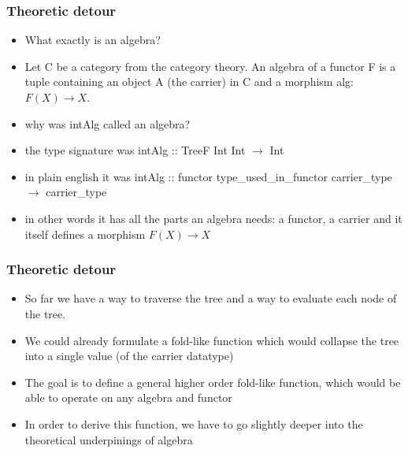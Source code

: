 \documentclass[10pt]{beamer}
\begin{document}
\begin{frame}[fragile]
\frametitle{Theoretic detour}
\begin{itemize}
\item What exactly is an algebra? 
\item Let C be a category from the category theory. An algebra of a functor F is a tuple containing an object A (the carrier) in C and a morphism alg:$F(X) \rightarrow X$. 
\item why was intAlg called an algebra?
\item the type signature was intAlg :: TreeF Int Int $\rightarrow$ Int
\item in plain english it was intAlg :: functor type\_used\_in\_functor carrier\_type $\rightarrow$ carrier\_type
\item in other words it has all the parts an algebra needs: a functor, a carrier and it itself defines a morphism $F(X) \rightarrow X$
\end{itemize}

\end{frame}



\begin{frame}[fragile]
\frametitle{Theoretic detour}
\begin{itemize}
\item So far we have a way to traverse the tree and a way to evaluate each node of the tree.
\item We could already formulate a fold-like function which would collapse the tree into a single value (of the carrier datatype)	
\item The goal is to define a general higher order fold-like function, which would be able to operate on any algebra and functor
\item In order to derive this function, we have to go slightly deeper into the theoretical underpinings of algebra 
\end{itemize}



\end{frame}
\end{document}
